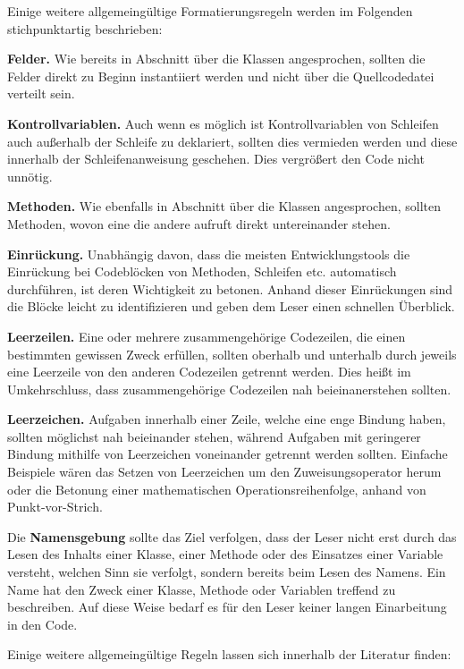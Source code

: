 \documentclass[utf8,biblatex]{lni}
\begin{document}
Einige weitere allgemeingültige Formatierungsregeln werden im Folgenden stichpunktartig beschrieben:

\textbf{Felder.} Wie bereits in Abschnitt über die Klassen angesprochen, sollten die Felder direkt zu Beginn instantiiert werden und nicht über die Quellcodedatei verteilt sein.

\textbf{Kontrollvariablen.} Auch wenn es möglich ist Kontrollvariablen von Schleifen auch außerhalb der Schleife zu deklariert, sollten dies vermieden werden und diese innerhalb der Schleifenanweisung geschehen. Dies vergrößert den Code nicht unnötig.

\textbf{Methoden.} Wie ebenfalls in Abschnitt über die Klassen angesprochen, sollten Methoden, wovon eine die andere aufruft direkt untereinander stehen.

\textbf{Einrückung.} Unabhängig davon, dass die meisten Entwicklungstools die Einrückung bei Codeblöcken von Methoden, Schleifen etc. automatisch durchführen, ist deren Wichtigkeit zu betonen. Anhand dieser Einrückungen sind die Blöcke leicht zu identifizieren und geben dem Leser einen schnellen Überblick.

\textbf{Leerzeilen.} Eine oder mehrere zusammengehörige Codezeilen, die einen bestimmten gewissen Zweck erfüllen, sollten oberhalb und unterhalb durch jeweils eine Leerzeile von den anderen Codezeilen getrennt werden. Dies heißt im Umkehrschluss, dass zusammengehörige Codezeilen nah beieinanerstehen sollten.

\textbf{Leerzeichen.} Aufgaben innerhalb einer Zeile, welche eine enge Bindung haben, sollten möglichst nah beieinander stehen, während Aufgaben mit geringerer Bindung mithilfe von Leerzeichen voneinander getrennt werden sollten. Einfache Beispiele wären das Setzen von Leerzeichen um den Zuweisungsoperator herum oder die Betonung einer mathematischen Operationsreihenfolge, anhand von Punkt-vor-Strich.


Die \textbf{Namensgebung} sollte das Ziel verfolgen, dass der Leser nicht erst durch das Lesen des Inhalts einer Klasse, einer Methode oder des Einsatzes einer Variable versteht, welchen Sinn sie verfolgt, sondern bereits beim Lesen des Namens. Ein Name hat den Zweck einer Klasse, Methode oder Variablen treffend zu beschreiben. Auf diese Weise bedarf es für den Leser keiner langen Einarbeitung in den Code.

Einige weitere allgemeingültige Regeln lassen sich innerhalb der Literatur finden:
\end{document}
